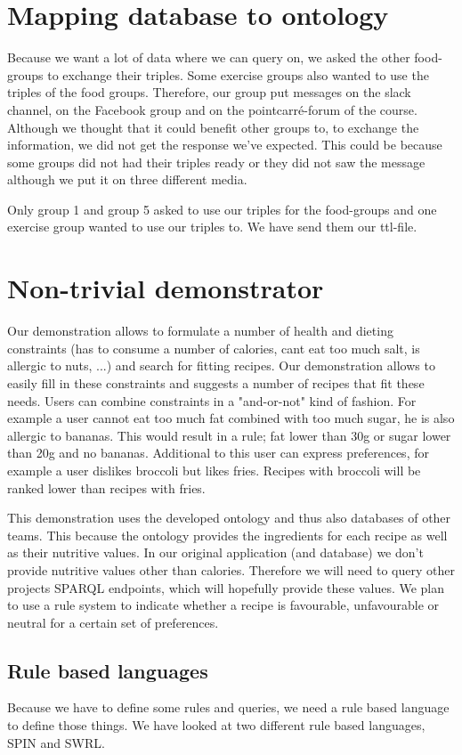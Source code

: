 \section{Mapping database to ontology}
Because we want a lot of data where we can query on, we asked the other food-groups to exchange their triples. Some exercise groups also wanted to use the triples of the food groups. Therefore, our group put messages on the slack channel, on the Facebook group and on the pointcarré-forum of the course. Although we thought that it could benefit other groups to, to exchange the information, we did not get the response we've expected. This could be because some groups did not had their triples ready or they did not saw the message although we put it on three different media. 

Only group 1 and group 5 asked to use our triples for the food-groups and one exercise group wanted to use our triples to. We have send them our ttl-file. 
\section{Non-trivial demonstrator}
Our demonstration allows to formulate a number of health and dieting constraints (has to consume a number of calories, cant eat too much salt, is allergic to nuts, ...) and search for fitting recipes. Our demonstration allows to easily fill in these constraints and suggests a number of recipes that fit these needs. Users can combine constraints in a "and-or-not" kind of fashion. For example a user cannot eat too much fat combined with too much sugar, he is also allergic to bananas. This would result in a rule; fat lower than 30g or sugar lower than 20g and no bananas. Additional to this user can express preferences, for example a user dislikes broccoli but likes fries. Recipes with broccoli will be ranked lower than recipes with fries.

This demonstration uses the developed ontology and thus also databases of other teams. This because the ontology provides the ingredients for each recipe as well as their nutritive values. In our original application (and database) we don't provide nutritive values other than calories. Therefore we will need to query other projects SPARQL endpoints, which will hopefully provide these values. We plan to use a rule system to indicate whether a recipe is favourable, unfavourable or neutral for a certain set of preferences.
\subsection{Rule based languages}
Because we have to define some rules and queries, we need a rule based language to define those things. We have looked at two different rule based languages, SPIN and SWRL.
